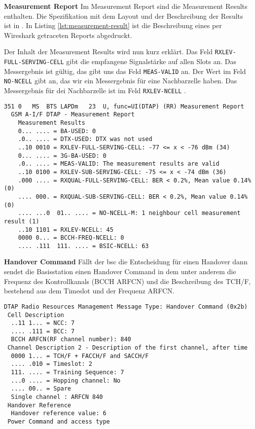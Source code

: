 \textbf{Measurement Report}
Im Measurement Report sind die Measurement Results enthalten. Die Spezifikation mit dem Layout und der Beschreibung der Results ist in \cite[10.5.2.20]{bib:3gpp0408}. In Listing \ref{lst:measurement-result} ist die Beschreibung eines per Wireshark getraceten Reports abgedruckt.

Der Inhalt der Measurement Results wird nun kurz erklärt. Das Feld \lstinline{RXLEV-FULL-SERVING-CELL} gibt die empfangene Signalstärke auf allen Slots an. Das Messergebnis ist gültig, das gibt uns das Feld \lstinline{MEAS-VALID} an. Der Wert im Feld \lstinline{NO-NCELL} gibt an, das wir ein Messergebnis für eine Nachbarzelle haben. Das Messergebnis für dei Nachbarzelle ist im Feld \lstinline{RXLEV-NCELL} \cite[Table 10.40]{bib:3gpp0408}.

\begin{lstlisting}[label=lst:measurement-result,caption={Measurement Result}]
351	0	MS	BTS	LAPDm	23	U, func=UI(DTAP) (RR) Measurement Report 
  GSM A-I/F DTAP - Measurement Report
    Measurement Results
    0... .... = BA-USED: 0
    .0.. .... = DTX-USED: DTX was not used
    ..10 0010 = RXLEV-FULL-SERVING-CELL: -77 <= x < -76 dBm (34)
    0... .... = 3G-BA-USED: 0
    .0.. .... = MEAS-VALID: The measurement results are valid
    ..10 0100 = RXLEV-SUB-SERVING-CELL: -75 <= x < -74 dBm (36)
    .000 .... = RXQUAL-FULL-SERVING-CELL: BER < 0.2%, Mean value 0.14% (0)
    .... 000. = RXQUAL-SUB-SERVING-CELL: BER < 0.2%, Mean value 0.14% (0)
    .... ...0  01.. .... = NO-NCELL-M: 1 neighbour cell measurement result (1)
    ..10 1101 = RXLEV-NCELL: 45
    0000 0... = BCCH-FREQ-NCELL: 0
    .... .111  111. .... = BSIC-NCELL: 63
\end{lstlisting}

\textbf{Handover Command}
Fällt der \gls{bsc} die Entscheidung für einen Handover dann sendet die Basisstation einen Handover Command in dem unter anderem die Frequenz des Kontrollkanals (\gls{BCCH} \gls{ARFCN}) und die Beschreibung des \gls{TCH/F}, bestehend aus dem Timeslot und der Frequenz \gls{ARFCN}.

\begin{lstlisting}[label=lst:handover-command,caption={Handover Command}]
DTAP Radio Resources Management Message Type: Handover Command (0x2b)
 Cell Description
  ..11 1... = NCC: 7
  .... .111 = BCC: 7
  BCCH ARFCN(RF channel number): 840
 Channel Description 2 - Description of the first channel, after time
  0000 1... = TCH/F + FACCH/F and SACCH/F
  .... .010 = Timeslot: 2
  111. .... = Training Sequence: 7
  ...0 .... = Hopping channel: No
  .... 00.. = Spare
  Single channel : ARFCN 840
 Handover Reference
  Handover reference value: 6
 Power Command and access type
\end{lstlisting}
  
